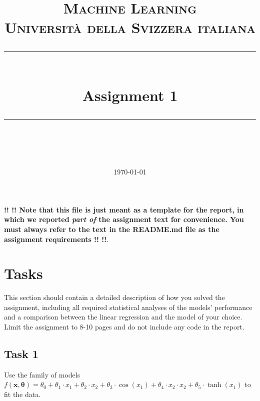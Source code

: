 \documentclass[11pt]{scrartcl}
\title{	
	\normalfont\normalsize
	\textsc{Machine Learning\\%
	Universit\`a della Svizzera italiana}\\
	\vspace{25pt}
	\rule{\linewidth}{0.5pt}\\
	\vspace{20pt}
	{\huge Assignment 1}\\
	\vspace{12pt}
	\rule{\linewidth}{1pt}\\
	\vspace{12pt}
}
\author{\LARGE \thestudent}
\date{\normalsize\today}
\begin{document}
\maketitle


\noindent \textbf{!! !!  Note that this file is just meant as a template for the report, in which we reported \textit{part of} the assignment text for convenience. You must always refer to the text in the README.md file as the assignment requirements  !! !!}.


\section*{Tasks}

This section should contain a detailed description of how you solved the assignment, including all required statistical analyses of the models' performance and a comparison between the linear regression and the model of your choice. Limit the assignment to 8-10 pages and do not include any code in the report.

\subsection*{Task 1}
Use the family of models $f(\mathbf{x}, \boldsymbol{\theta}) = \theta_0 + \theta_1 \cdot x_1 + \theta_2 \cdot x_2 + \theta_3 \cdot \cos(x_1) + \theta_4 \cdot x_2 \cdot x_2 + \theta_5 \cdot \tanh(x_1)$ to fit the data. 


\end{document}
